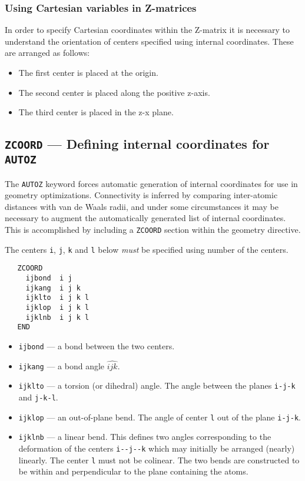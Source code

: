 \subsubsection{Using Cartesian variables in Z-matrices}
\label{sec:zmcart}

In order to specify Cartesian coordinates within the Z-matrix it is
necessary to understand the orientation of centers specified using
internal coordinates.  These are arranged as follows:
\begin{itemize}
\item The first center is placed at the origin.
\item The second center is placed along the positive z-axis.
\item The third center is placed in the z-x plane.
\end{itemize}

\subsection{{\tt ZCOORD} --- Defining internal coordinates for {\tt AUTOZ}}
\label{sec:zcoord}

The \verb+AUTOZ+ keyword forces automatic generation of internal
coordinates for use in geometry optimizations.  Connectivity
is inferred by comparing inter-atomic distances with van de Waals
radii, and under some circumstances it may be necessary to augment the
automatically generated list of internal coordinates.  This is
accomplished by including a {\tt ZCOORD} section within the geometry
directive.

The centers \verb+i+, \verb+j+, \verb+k+ and \verb+l+ below {\em must} be
specified using number of the centers.
\begin{verbatim}
   ZCOORD
     ijbond  i j
     ijkang  i j k
     ijklto  i j k l
     ijklop  i j k l
     ijklnb  i j k l
   END
\end{verbatim}

\begin{itemize}
\item {\tt ijbond} --- a bond between the two centers.
\item {\tt ijkang} --- a bond angle $\widehat{ijk}$.
\item {\tt ijklto} --- a torsion (or dihedral) angle.  The
  angle between the planes \verb+i-j-k+ and \verb+j-k-l+.
\item {\tt ijklop} --- an out-of-plane bend.  The angle of center
  \verb+l+ out of the plane \verb+i-j-k+.
\item {\tt ijklnb} --- a linear bend.  This defines two angles
  corresponding to the deformation of the centers \verb+i--j--k+ 
  which may initially be arranged (nearly) linearly.  The center
  \verb+l+ must not be colinear.  The two bends are constructed to be
  within and perpendicular to the plane containing the atoms.
\end{itemize}   

